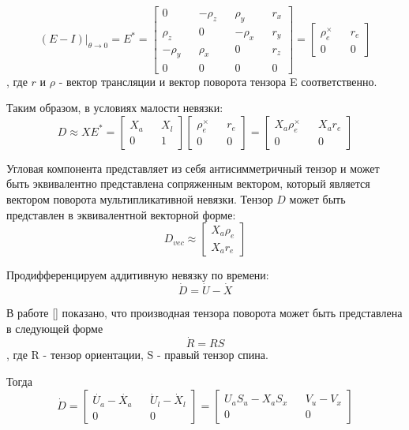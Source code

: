\documentclass[a4paper]{article}
\begin{document}
$$
(E - I)|_{\theta\rightarrow0} = E^* = 
\begin{bmatrix}
0         && -\rho_z &&  \rho_y && r_x\\
 \rho_z && 0         && -\rho_x && r_y\\
-\rho_y &&  \rho_x && 0         && r_z\\
0&&0&&0&&0
\end{bmatrix} = \begin{bmatrix}\rho_e^\times&&r_e\\0&&0\end{bmatrix}
$$
, где $r$ и $\rho$ - вектор трансляции и вектор поворота тензора E соответственно.

Таким образом, в условиях малости невязки:
\begin{equation} D \approx X E^* = \begin{bmatrix}X_a&&X_l\\0&&1\end{bmatrix} \begin{bmatrix}\rho_e^\times&&r_e\\0&&0\end{bmatrix} = \begin{bmatrix}X_a\rho_e^\times&&X_ar_e\\0&&0\end{bmatrix} \end{equation}

Угловая компонента представляет из себя антисимметричный тензор и может быть эквивалентно представлена сопряженным вектором, который является вектором поворота мультипликативной невязки. Тензор $D$ может быть представлен в эквивалентной векторной форме:
\begin{equation} D_{vec} \approx \begin{bmatrix}X_a\rho_e\\X_ar_e\end{bmatrix} \end{equation}

Продифференцируем аддитивную невязку по времени:
\begin{equation} \dot{D} = \dot{U} -\dot{X} \end{equation}

В работе [] показано, что производная тензора поворота может быть представлена в следующей форме
\begin{equation} \dot{R} = R S \end{equation}
, где R - тензор ориентации, S - правый тензор спина.

Тогда 
\begin{equation} 
\dot{D} = \begin{bmatrix}\dot{U_a} - \dot{X_a}&&\dot{U}_l-\dot{X}_l\\0&&0\end{bmatrix} 
= \begin{bmatrix}U_aS_u - X_aS_x&&V_u-V_x\\0&&0\end{bmatrix}\end{equation}
\end{document}
